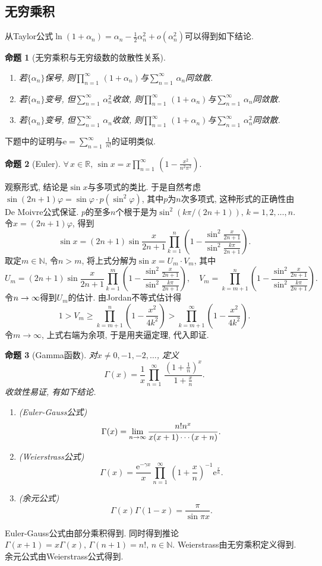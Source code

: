 \documentclass[11pt,a4paper]{ctexart}
\makeatletter
\theoremstyle{thmseries} %
\newtheorem{prop}{命题}[section]
\theoremstyle{exerseries}
\renewenvironment{proof}[1][\proofname]{\par
  \pushQED{\qed}%
  \normalfont \topsep6\p@\@plus6\p@\relax
  \trivlist
  \item[\hskip\labelsep
        \itshape
    #1\@addpunct{}]\ignorespaces
}{%
  \popQED\endtrivlist\@endpefalse
}
\newenvironment{pf}{\begin{proof}[\bfseries\upshape 证\quad]}{\end{proof}}
\newcommand{\bra}[1]{\mathopen{}\left(#1\right)}
\renewcommand{\phi}{\varphi}
\newcommand{\R}{\mathbb{R}}
\newcommand{\N}{\mathbb{N}}
\newcommand{\e}{\mathrm{e}}
\def \nti {\mathnormal{n}\to\infty}
\def \tseries {{\textstyle\sum\limits_{n=1}^{\infty}}\,} %
\def \tprod {{\textstyle\prod\limits_{n=1}^{\infty}}\,} %
\def \dprod {\prod_{n=1}^{\infty}\,} %
\makeatother
\begin{document}
\subsection{无穷乘积}
从Taylor公式$\ln(1+\alpha_n)=\alpha_n-\frac{1}{2}\alpha_n^2+o(\alpha_n^2)$可以得到如下结论. 
\begin{prop}[无穷乘积与无穷级数的敛散性关系]
	\phantom{text}
	\begin{enumerate}
		\item 若$\{\alpha_n\}$保号, 则$\tprod(1+\alpha_n)$与$\tseries\alpha_n$同敛散. 
		\item 若$\{\alpha_n\}$变号, 但$\tseries\alpha_n^2$收敛, 则$\tprod(1+\alpha_n)$与$\tseries\alpha_n$同敛散. 
		\item 若$\{\alpha_n\}$变号, 但$\tseries\alpha_n$收敛, 则$\tprod(1+\alpha_n)$与$\tseries\alpha_n^2$同敛散. 
	\end{enumerate}
\end{prop}

下题中的证明与$\e=\tseries\frac{1}{n!}$的证明类似. \vspace{-.5em}
\begin{prop}[Euler]
	$\forall\,x\in\R,\,\sin x=x\tprod\bra{1-\frac{x^2}{n^2\pi^2}}.$
\end{prop}
\begin{pf}
	观察形式, 结论是$\sin x$与多项式的类比. 于是自然考虑$\sin(2n+1)\phi=\sin\phi\cdot p(\sin^2\phi)$, 其中$p$为$n$次多项式, 这种形式的正确性由De Moivre公式保证. $p$的至多$n$个根于是为$\sin^2\bra{k\pi/(2n+1)},\,k=1,2,\dots,n$. 令$x=(2n+1)\phi$, 得到
	\[\sin x=(2n+1)\sin\frac{x}{2n+1}\prod_{k=1}^{n}\bra{1-\frac{\sin^2\frac{x}{2n+1}}{\sin^2\frac{k\pi}{2n+1}}}.\]
	取定$m\in\N$, 令$n>m$, 将上式分解为$\sin x=U_m\cdot V_m$, 其中
	\[U_m=(2n+1)\sin\frac{x}{2n+1}\prod_{k=1}^{m}\bra{1-\frac{\sin^2\frac{x}{2n+1}}{\sin^2\frac{k\pi}{2n+1}}},\quad V_m=\prod_{k=m+1}^{n}\bra{1-\frac{\sin^2\frac{x}{2n+1}}{\sin^2\frac{k\pi}{2n+1}}}.\]
	令$\nti$得到$U_m$的估计. 由Jordan不等式估计得
	\[1>V_m\geq\prod_{k=m+1}^{n}\bra{1-\frac{x^2}{4k^2}}>\prod_{k=m+1}^{\infty}\bra{1-\frac{x^2}{4k^2}}.\]
	令$m\to\infty$, 上式右端为余项, 于是用夹逼定理, 代入即证. 
\end{pf}

\begin{prop}[Gamma函数]
	对$x\neq0,-1,-2,\dots$, 定义
	\[\Gamma(x)=\frac{1}{x}\dprod\frac{\bra{1+\frac{1}{n}}^x}{1+\frac{x}{n}}.\]
	收敛性易证, 有如下结论. 
	\begin{enumerate}
		\item (Euler-Gauss公式)
		\[\Gamma(x)=\lim_{\nti}\frac{n!n^x}{x(x+1)\cdots(x+n)}.\]
		\item (Weierstrass公式)
		\[\Gamma(x)=\frac{\e^{-\gamma x}}{x}\dprod\bra{1+\frac{x}{n}}^{-1}\e^\frac{x}{n}.\]
		\item (余元公式)
		\[\Gamma(x)\Gamma(1-x)=\frac{\pi}{\sin\pi x}.\]
	\end{enumerate}
\end{prop}
\begin{pf}
	Euler-Gauss公式由部分乘积得到. 同时得到推论$\Gamma(x+1)=x\Gamma(x),\,\Gamma(n+1)=n!,\,n\in\N$. Weierstrass由无穷乘积定义得到. 余元公式由Weierstrass公式得到. 
\end{pf}
\end{document}
